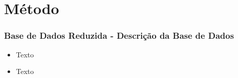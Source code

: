 \section{Método}
\begin{frame}
\frametitle{Base de Dados Reduzida - Descrição da Base de Dados}
\justifying

\begin{itemize}
    \item  Texto
    \vspace{0.2cm}

    \item Texto
    \vspace{0.2cm}

\end{itemize}    
\end{frame}